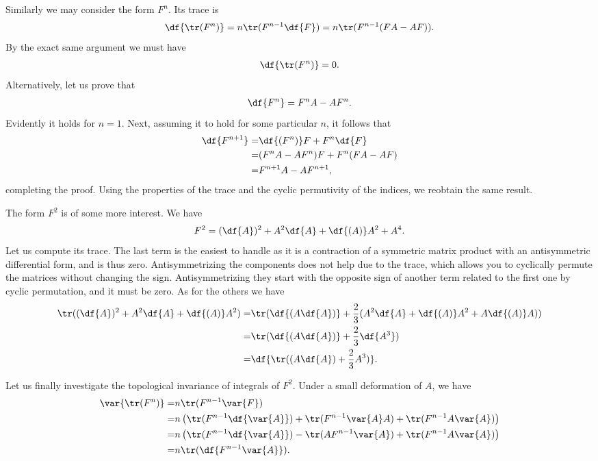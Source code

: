 Similarly we may consider the form $F^{n}$. Its trace is
\begin{align*}
	\df{\tr(F^{n})} = n\tr(F^{n - 1}\df{F}) = n\tr(F^{n - 1}(FA - AF)).
\end{align*}
By the exact same argument we must have
\begin{align*}
	\df{\tr(F^{n})} = 0.
\end{align*}
Alternatively, let us prove that
\begin{align*}
	\df{F^{n}} = F^{n}A - AF^{n}.
\end{align*}
Evidently it holds for $n = 1$. Next, assuming it to hold for some particular $n$, it follows that
\begin{align*}
	\df{F^{n + 1}} =& \df{(F^{n})}F + F^{n}\df{F} \\
	               =& (F^{n}A - AF^{n})F + F^{n}(FA - AF) \\
	               =& F^{n + 1}A - AF^{n + 1},
\end{align*}
completing the proof. Using the properties of the trace and the cyclic permutivity of the indices, we reobtain the same result.

The form $F^{2}$ is of some more interest. We have
\begin{align*}
	F^{2} = (\df{A})^{2} + A^{2}\df{A} + \df{(A)}A^{2} + A^{4}.
\end{align*}
Let us compute its trace. The last term is the easiest to handle as it is a contraction of a symmetric matrix product with an antisymmetric differential form, and is thus zero. Antisymmetrizing the components does not help due to the trace, which allows you to cyclically permute the matrices without changing the sign. Antisymmetrizing they start with the opposite sign of another term related to the first one by cyclic permutation, and it must be zero. As for the others we have
\begin{align*}
	\tr((\df{A})^{2} + A^{2}\df{A} + \df{(A)}A^{2}) =& \tr(\df{(A\df{A})} + \frac{2}{3}(A^{2}\df{A} + \df{(A)}A^{2} + A\df{(A)}A)) \\
	                                                =& \tr(\df{(A\df{A})} + \frac{2}{3}\df{A^{3}}) \\
	                                                =& \df{\tr((A\df{A}) + \frac{2}{3}A^{3})}.
\end{align*}

Let us finally investigate the topological invariance of integrals of $F^{2}$. Under a small deformation of $A$, we have
\begin{align*}
	\var{\tr(F^{n})} =& n\tr(F^{n - 1}\var{F}) \\
	                 =& n\left(\tr(F^{n - 1}\df{\var{A}}) + \tr(F^{n - 1}\var{A}A) + \tr(F^{n - 1}A\var{A})\right) \\
	                 =& n\left(\tr(F^{n - 1}\df{\var{A}}) - \tr(AF^{n - 1}\var{A}) + \tr(F^{n - 1}A\var{A})\right) \\
	                 =& n\tr(\df{F^{n - 1}\var{A}}).
\end{align*}

